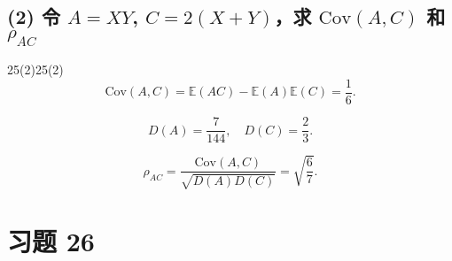 \documentclass[twoside]{article}
\begin{document}
\subsection*{(2) 令 \( A = XY \), \( C = 2(X + Y) \)，求 \( \text{Cov}(A, C) \) 和 \( \rho_{AC} \)}

\begin{ans}{25(2)}{25(2)}
\[
\text{Cov}(A, C) = \mathbb{E}(AC) - \mathbb{E}(A)\mathbb{E}(C) = \frac{1}{6}.
\]

\[
D(A) = \frac{7}{144}, \quad D(C) = \frac{2}{3}.
\]

\[
\rho_{AC} = \frac{\text{Cov}(A, C)}{\sqrt{D(A) D(C)}} = \sqrt{\frac{6}{7}}.
\]

\end{ans}

\section{习题 26}
\end{document}

